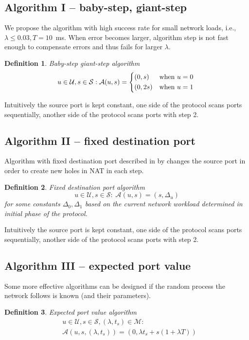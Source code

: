 \documentclass[twoside]{article}
\newtheorem{mydef}{Definition}
\begin{document}
\begin{multicols}{2}
\subsection{Algorithm I -- baby-step, giant-step}
We propose the algorithm with high success rate for small network loads, i.e.,
$\lambda \leq 0.03, T=10$~ms. When error becomes larger,
algorithm step is not fast enough to compensate errors and thus fails for larger $\lambda$.

\begin{mydef}
Baby-step giant-step algorithm
\[
u \in \mathcal{U}, s \in \mathcal{S}: 
\mathcal{A}(u, s) = \begin{dcases*}
         (0, s)  & when $u=0$\\
         (0, 2s) & when $u=1$
        \end{dcases*}
\]
\end{mydef}

Intuitively the source port is kept constant, one side of the protocol scans ports sequentially, another
side of the protocol scans ports with step 2.

\subsection{Algorithm II -- fixed destination port}
Algorithm with fixed destination port described in by \citep{Wang:2006:RSN:1156422.1156550}
changes the source port in order to create new holes in NAT in each step.

\begin{mydef}
Fixed destination port algorithm
\[
u \in \mathcal{U}, s \in \mathcal{S}: \;
\mathcal{A}(u, s) = (s, \Delta_u)
\] for some constants $\Delta_0, \Delta_1$ based on the current network workload determined in initial phase
of the protocol.
\end{mydef}

Intuitively the source port is kept constant, one side of the protocol scans ports sequentially, another
side of the protocol scans ports with step 2.

\subsection{Algorithm III -- expected port value}
Some more effective algorithms can be designed if the random process the network follows is known (and their
parameters).

\begin{mydef}
Expected port value algorithm
\begin{align*}
& u \in \mathcal{U}, s \in \mathcal{S}, (\lambda, t_s) \in \mathcal{M}:\\
& \mathcal{A}(u, s, (\lambda, t_s)) = (0, \lambda t_s + s(1 + \lambda T))
\end{align*}
\end{mydef}


\end{multicols}
\end{document}
